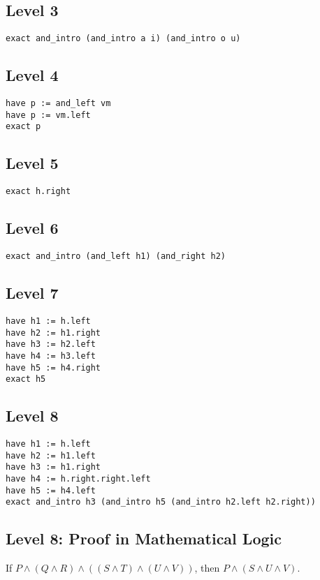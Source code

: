 \documentclass{article}
\theoremstyle{theorem}
\theoremstyle{definition}
\theoremstyle{remark}
\begin{document}
\subsection*{Level 3}
\texttt{exact and\_intro (and\_intro a i) (and\_intro o u)}

\subsection*{Level 4}
\begin{verbatim}
have p := and_left vm
have p := vm.left
exact p
\end{verbatim}

\subsection*{Level 5}
\texttt{exact h.right}

\subsection*{Level 6}
\texttt{exact and\_intro (and\_left h1) (and\_right h2)}

\subsection*{Level 7}
\begin{verbatim}
have h1 := h.left
have h2 := h1.right
have h3 := h2.left
have h4 := h3.left
have h5 := h4.right
exact h5
\end{verbatim}

\subsection*{Level 8}
\begin{verbatim}
have h1 := h.left
have h2 := h1.left
have h3 := h1.right
have h4 := h.right.right.left
have h5 := h4.left
exact and_intro h3 (and_intro h5 (and_intro h2.left h2.right))
\end{verbatim}

\subsection*{Level 8: Proof in Mathematical Logic}

If $P \land (Q \land R) \land ((S \land T) \land (U \land V))$, then $P \land (S \land U \land V)$.
\end{document}
